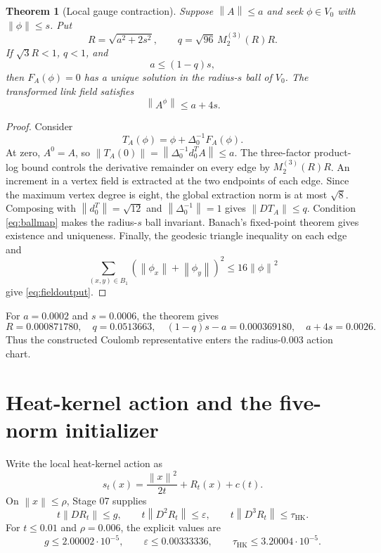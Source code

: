 \documentclass[11pt]{article}
\newtheorem{theorem}{Theorem}[section]
\theoremstyle{definition}
\newcommand{\norm}[1]{\left\lVert #1\right\rVert}
\begin{document}
\begin{theorem}[Local gauge contraction]\label{thm:gauge}
Suppose $\norm A\le a$ and seek $\phi\in V_0$ with $\norm\phi\le s$.  Put
\[
 R=\sqrt{a^2+2s^2},\qquad
 q=\sqrt{96}\,M_2^{(3)}(R)R.
\]
If $\sqrt3R<1$, $q<1$, and
\begin{equation}\label{eq:ballmap}
 a\le(1-q)s,
\end{equation}
then $F_A(\phi)=0$ has a unique solution in the radius-$s$ ball of $V_0$.
The transformed link field satisfies
\begin{equation}\label{eq:fieldoutput}
 \norm{A^\phi}\le a+4s.
\end{equation}
\end{theorem}

\begin{proof}
Consider
\[
 T_A(\phi)=\phi+\Delta_0^{-1}F_A(\phi).
\]
At zero, $A^0=A$, so
$\norm{T_A(0)}=\norm{\Delta_0^{-1}d_0^TA}\le a$.
The three-factor product-log bound controls the derivative remainder on every
edge by $M_2^{(3)}(R)R$.  An increment in a vertex field is extracted at the
two endpoints of each edge.  Since the maximum vertex degree is eight, the
global extraction norm is at most $\sqrt8$.  Composing with
$\norm{d_0^T}=\sqrt{12}$ and $\norm{\Delta_0^{-1}}=1$ gives
$\norm{DT_A}\le q$.  Condition \eqref{eq:ballmap} makes the radius-$s$ ball
invariant.  Banach's fixed-point theorem gives existence and uniqueness.
Finally, the geodesic triangle inequality on each edge and
\[
 \sum_{(x,y)\in B_1}(\norm{\phi_x}+\norm{\phi_y})^2
 \le16\norm\phi^2
\]
give \eqref{eq:fieldoutput}.
\end{proof}

For $a=0.0002$ and $s=0.0006$, the theorem gives
\[
 R=0.000871780,\quad q=0.0513663,\quad
 (1-q)s-a=0.000369180,\quad a+4s=0.0026.
\]
Thus the constructed Coulomb representative enters the radius-$0.003$
action chart.

\section{Heat-kernel action and the five-norm initializer}\label{sec:action}

Write the local heat-kernel action as
\[
 s_t(x)=\frac{\norm x^2}{2t}+R_t(x)+c(t).
\]
On $\norm x\le\rho$, Stage 07 supplies
\begin{equation}\label{eq:radialbudgets}
 t\norm{DR_t}\le g,\qquad
 t\norm{D^2R_t}\le\varepsilon,\qquad
 t\norm{D^3R_t}\le\tau_{\mathrm{HK}}.
\end{equation}
For $t\le0.01$ and $\rho=0.006$, the explicit values are
\[
 g\le2.00002\cdot10^{-5},\qquad
 \varepsilon\le0.00333336,\qquad
 \tau_{\mathrm{HK}}\le3.20004\cdot10^{-5}.
\]
\end{document}
